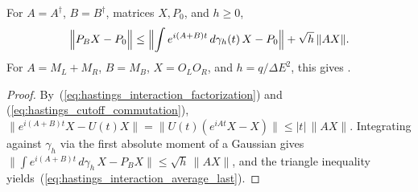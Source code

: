 \begin{lemma}
    \label{thm:hastings_interaction_average_last}
    \leanok
    For $A=A^\dagger$, $B=B^\dagger$, matrices $X,P_0$, and $h\geq0$,
    \begin{align}
        \Bigl\|P_BX-P_0\Bigr\|
        \leq\Bigl\|\int e^{i(A+B)t}\,d\gamma_h(t)\,X-P_0\Bigr\|
        +\sqrt h\,\|AX\|.
        \label{eq:hastings_interaction_average_last}
    \end{align}
    For $A=M_L+M_R$, $B=M_B$, $X=O_LO_R$, and $h=q/\Delta E^2$, this gives
    \cite[eq.~(last), lines 881--890]{Hastings2007AreaLaw}.
\end{lemma}
\begin{proof}\leanok
    By~(\ref{eq:hastings_interaction_factorization}) and
    (\ref{eq:hastings_cutoff_commutation}),
    $\|e^{i(A+B)t}X-U(t)X\|=\|U(t)(e^{iAt}X-X)\|\leq|t|\,\|AX\|$. Integrating
    against $\gamma_h$ via the first absolute moment of a Gaussian
    \cite[``First absolute moment of a Gaussian'']{QICLean2026Blueprint}
    gives $\|\int e^{i(A+B)t}\,d\gamma_h\,X-P_BX\|\leq\sqrt h\,\|AX\|$, and the
    triangle inequality yields~(\ref{eq:hastings_interaction_average_last}).
\end{proof}
